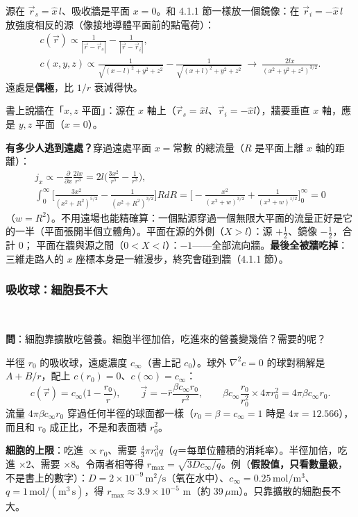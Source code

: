 源在 $\vec r_s=\hat x\,l$、吸收牆是平面 $x=0$。和 4.1.1 節一樣放一個鏡像：在 $\vec r_i=-\hat x\,l$ 放強度相反的源（像接地導體平面前的點電荷）：
\begin{gather*}
c(\vec r)\propto\frac1{|\vec r-\vec r_s|}-\frac1{|\vec r-\vec r_i|},\tag{4.57}\\
c(x,y,z)\propto\frac1{\sqrt{(x-l)^2+y^2+z^2}}-\frac1{\sqrt{(x+l)^2+y^2+z^2}}\ \to\ \frac{2lx}{(x^2+y^2+z^2)^{3/2}}.\tag{4.58}
\end{gather*}
遠處是\textbf{偶極}，比 $1/r$ 衰減得快。
\begin{errbox}[p.~87，(4.58) 前]
書上說牆在「$x,z$ 平面」：源在 $x$ 軸上（$\vec r_s=\hat xl$、$\vec r_i=-\hat xl$），牆要垂直 $x$ 軸，應是 $y,z$ 平面（$x=0$）。
\end{errbox}
\textbf{有多少人逃到遠處？}穿過遠處平面 $x=\text{常數}$ 的總流量（$R$ 是平面上離 $x$ 軸的距離）：
\begin{gather*}
j_x\propto-\frac{\partial}{\partial x}\frac{2lx}{r^3}=2l\Big(\frac{3x^2}{r^5}-\frac1{r^3}\Big),\tag{4.59}\\
\int_0^\infty\Big[\frac{3x^2}{(x^2+R^2)^{5/2}}-\frac1{(x^2+R^2)^{3/2}}\Big]RdR=\Big[-\frac{x^2}{(x^2+w)^{3/2}}+\frac1{(x^2+w)^{1/2}}\Big]_0^\infty=0\tag{4.60}
\end{gather*}
（$w=R^2$）。不用遠場也能精確算：一個點源穿過一個無限大平面的流量正好是它的一半（平面張開半個立體角）。平面在源的外側（$X>l$）：源 $+\frac12$、鏡像 $-\frac12$，合計 0；
平面在牆與源之間（$0<X<l$）：$-1$——全部流向牆。\textbf{最後全被牆吃掉}：三維走路人的 $x$ 座標本身是一維漫步，終究會碰到牆（4.1.1 節）。

\subsubsection{吸收球：細胞長不大}
\ 

\textbf{問}：細胞靠擴散吃營養。細胞半徑加倍，吃進來的營養變幾倍？需要的呢？

半徑 $r_0$ 的吸收球，遠處濃度 $c_\infty$（書上記 $c_0$）。球外 $\nabla^2c=0$ 的球對稱解是 $A+B/r$，配上 $c(r_0)=0$、$c(\infty)=c_\infty$：
\[c(\vec r)=c_\infty\Big(1-\frac{r_0}{r}\Big),\qquad \vec j=-\hat r\frac{\beta c_\infty r_0}{r^2},\qquad \beta c_\infty\frac{r_0}{r_0^2}\times4\pi r_0^2=4\pi\beta c_\infty r_0.\tag{4.61--4.63}\]
流量 $4\pi\beta c_\infty r_0$ 穿過任何半徑的球面都一樣（$r_0=\beta=c_\infty=1$ 時是 $4\pi=12.566$），而且和 $r_0$ 成正比，不是和表面積 $r_0^2$。

\textbf{細胞的上限}：吃進 $\propto r_0$、需要 $\frac43\pi r_0^3q$（$q$＝每單位體積的消耗率）。半徑加倍，吃進 $\times2$、需要 $\times8$。令兩者相等得
$r_{\max}=\sqrt{3Dc_\infty/q}$。例（\textbf{假設值，只看數量級}，不是書上的數字）：$D=2\times10^{-9}\,\mathrm{m^2/s}$（氧在水中）、$c_\infty=0.25\,\mathrm{mol/m^3}$、
$q=1\,\mathrm{mol/(m^3\,s)}$，得 $r_{\max}\approx3.9\times10^{-5}$ m（約 39\,$\mu$m）。只靠擴散的細胞長不大。

